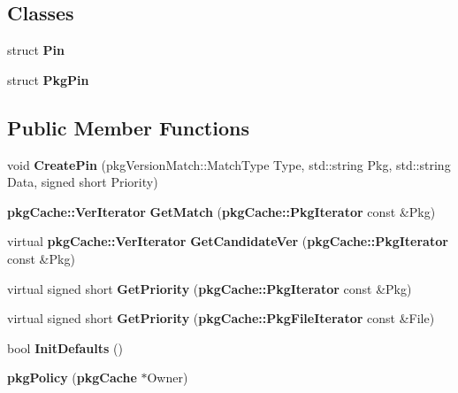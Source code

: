 \subsection*{\-Classes}
\begin{DoxyCompactItemize}
\item 
struct {\bf \-Pin}
\item 
struct {\bf \-Pkg\-Pin}
\end{DoxyCompactItemize}
\subsection*{\-Public \-Member \-Functions}
\begin{DoxyCompactItemize}
\item 
void {\bfseries \-Create\-Pin} (pkg\-Version\-Match\-::\-Match\-Type \-Type, std\-::string \-Pkg, std\-::string \-Data, signed short \-Priority)\label{classpkgPolicy_a334fcf0b5ebed2da32ff2d126918ba95}

\item 
{\bf pkg\-Cache\-::\-Ver\-Iterator} {\bfseries \-Get\-Match} ({\bf pkg\-Cache\-::\-Pkg\-Iterator} const \&\-Pkg)\label{classpkgPolicy_a07c99d9e5269027d7184581c36cc5803}

\item 
virtual {\bf pkg\-Cache\-::\-Ver\-Iterator} {\bfseries \-Get\-Candidate\-Ver} ({\bf pkg\-Cache\-::\-Pkg\-Iterator} const \&\-Pkg)\label{classpkgPolicy_a4ac1c4559a4c789e53abb28fe8786c0c}

\item 
virtual signed short {\bfseries \-Get\-Priority} ({\bf pkg\-Cache\-::\-Pkg\-Iterator} const \&\-Pkg)\label{classpkgPolicy_a68252ad1c70cfa8a84ba2471cd314e39}

\item 
virtual signed short {\bfseries \-Get\-Priority} ({\bf pkg\-Cache\-::\-Pkg\-File\-Iterator} const \&\-File)\label{classpkgPolicy_a005eb2274a6e24f178525d5b81c3c6ec}

\item 
bool {\bfseries \-Init\-Defaults} ()\label{classpkgPolicy_abff56c2533aa0185a7c2bc344fc68916}

\item 
{\bfseries pkg\-Policy} ({\bf pkg\-Cache} $\ast$\-Owner)\label{classpkgPolicy_a09125a1b5560d8c43c8e669560663a7d}

\end{DoxyCompactItemize}
